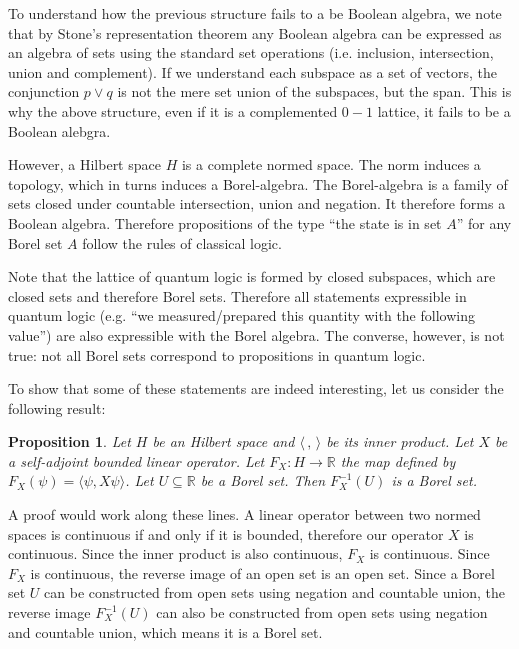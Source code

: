 \documentclass[10pt,twocolumn, nofootinbib]{revtex4-1}
\newtheorem{prop}[equation]{Proposition}
\begin{document}
To understand how the previous structure fails to a be Boolean algebra, we note that by Stone's representation theorem any Boolean algebra can be expressed as an algebra of sets using the standard set operations (i.e. inclusion, intersection, union and complement). If we understand each subspace as a set of vectors, the conjunction $p \vee q$ is not the mere set union of the subspaces, but the span. This is why the above structure, even if it is a complemented $0-1$ lattice, it fails to be a Boolean alebgra.

However, a Hilbert space $H$ is a complete normed space. The norm induces a topology, which in turns induces a Borel-algebra. The Borel-algebra is a family of sets closed under countable intersection, union and negation. It therefore forms a Boolean algebra. Therefore propositions of the type ``the state is in set $A$'' for any Borel set $A$ follow the rules of classical logic.

Note that the lattice of quantum logic is formed by closed subspaces, which are closed sets and therefore Borel sets. Therefore all statements expressible in quantum logic (e.g. ``we measured/prepared this quantity with the following value'') are also expressible with the Borel algebra. The converse, however, is not true: not all Borel sets correspond to propositions in quantum logic.

To show that some of these statements are indeed interesting, let us consider the following result:
\begin{prop}
	Let $H$ be an Hilbert space and $\langle \, , \, \rangle$ be its inner product. Let $X$ be a self-adjoint bounded linear operator. Let $F_X : H \to \mathbb{R}$ the map defined by $F_X(\psi) = \langle \psi , X \psi \rangle$. Let $U \subseteq \mathbb{R}$ be a Borel set. Then $F_X^{-1}(U)$ is a Borel set.
\end{prop}

A proof would work along these lines. A linear operator between two normed spaces is continuous if and only if it is bounded, therefore our operator $X$ is continuous. Since the inner product is also continuous, $F_X$ is continuous. Since $F_X$ is continuous, the reverse image of an open set is an open set. Since a Borel set $U$ can be constructed from open sets using negation and countable union, the reverse image $F_X^{-1}(U)$ can also be constructed from open sets using negation and countable union, which means it is a Borel set.
\end{document}
